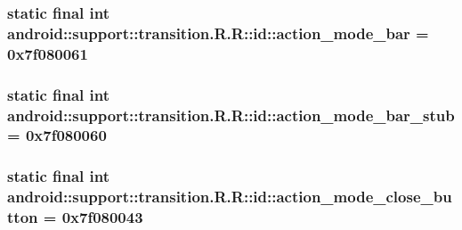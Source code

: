 \hypertarget{classandroid_1_1support_1_1transition_1_1_r_1_1id_4a6bf747982268d6b86a28d355e1ef68}{
\subsubsection[{action\_\-mode\_\-bar}]{\setlength{\rightskip}{0pt plus 5cm}static final int android::support::transition.R.R::id::action\_\-mode\_\-bar = 0x7f080061}}
\label{classandroid_1_1support_1_1transition_1_1_r_1_1id_4a6bf747982268d6b86a28d355e1ef68}


\hypertarget{classandroid_1_1support_1_1transition_1_1_r_1_1id_a68892a24b4746488327df4e94ef0f4f}{
\subsubsection[{action\_\-mode\_\-bar\_\-stub}]{\setlength{\rightskip}{0pt plus 5cm}static final int android::support::transition.R.R::id::action\_\-mode\_\-bar\_\-stub = 0x7f080060}}
\label{classandroid_1_1support_1_1transition_1_1_r_1_1id_a68892a24b4746488327df4e94ef0f4f}


\hypertarget{classandroid_1_1support_1_1transition_1_1_r_1_1id_b76b684d1c10e3b65d74fc3653c42fae}{
\subsubsection[{action\_\-mode\_\-close\_\-button}]{\setlength{\rightskip}{0pt plus 5cm}static final int android::support::transition.R.R::id::action\_\-mode\_\-close\_\-button = 0x7f080043}}
\label{classandroid_1_1support_1_1transition_1_1_r_1_1id_b76b684d1c10e3b65d74fc3653c42fae}


